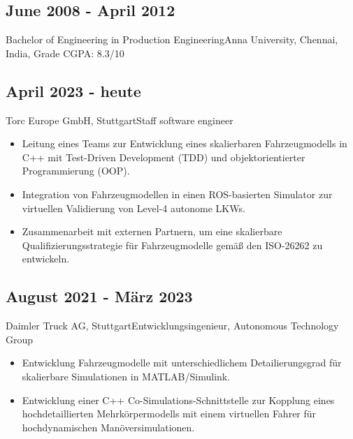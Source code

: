 \documentclass{mycv}
\begin{document}
\begin{paracol}{2}
{        \subsection{June 2008 - April 2012}{Bachelor of Engineering in
            Production Engineering}{Anna University, Chennai, India, {Grade CGPA: 8.3/10}}\\
}

{
    \subsection{April 2023 - heute}{Torc Europe GmbH, Stuttgart}{Staff software engineer}
          \begin{itemize}

            \item Leitung eines Teams zur Entwicklung eines skalierbaren
                Fahrzeugmodells in C++ mit Test-Driven Development (TDD) und
                objektorientierter Programmierung (OOP).

            \item Integration von Fahrzeugmodellen in einen ROS-basierten
                Simulator zur virtuellen Validierung von Level-4 autonome LKWs. 

            \item Zusammenarbeit mit externen Partnern, um eine skalierbare
                Qualifizierungsstrategie für Fahrzeugmodelle gem{\"a}{\ss} den
                ISO-26262 zu entwickeln.
          \end{itemize}
     
          \subsection{August 2021 - M{\"a}rz 2023}{Daimler Truck AG, Stuttgart}{Entwicklungsingenieur, Autonomous Technology Group}
           \begin{itemize}
               \item Entwicklung Fahrzeugmodelle mit unterschiedlichem
                   Detailierungsgrad f{\"u}r skalierbare Simulationen in MATLAB/Simulink.

               \item Entwicklung einer C++ Co-Simulations-Schnittstelle zur
                   Kopplung eines hochdetaillierten Mehrk{\"o}rpermodells mit
                   einem virtuellen Fahrer für hochdynamischen
                   Man{\"o}versimulationen.


\end{itemize}}
\end{paracol}
\end{document}
